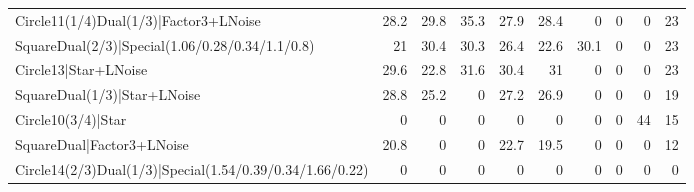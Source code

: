 \begin{tabular}{lrrrrrrrrr}
 Circle11(1/4)Dual(1/3)|Factor3+LNoise                    &           28.2 &           29.8 &            35.3 &           27.9 &           28.4 &             0   &             0   &             0   &           23 \\
 SquareDual(2/3)|Special(1.06/0.28/0.34/1.1/0.8)          &           21   &           30.4 &            30.3 &           26.4 &           22.6 &            30.1 &             0   &             0   &           23 \\
 Circle13|Star+LNoise                                     &           29.6 &           22.8 &            31.6 &           30.4 &           31   &             0   &             0   &             0   &           23 \\
 SquareDual(1/3)|Star+LNoise                              &           28.8 &           25.2 &             0   &           27.2 &           26.9 &             0   &             0   &             0   &           19 \\
 Circle10(3/4)|Star                                       &            0   &            0   &             0   &            0   &            0   &             0   &             0   &            44   &           15 \\
 SquareDual|Factor3+LNoise                                &           20.8 &            0   &             0   &           22.7 &           19.5 &             0   &             0   &             0   &           12 \\
 Circle14(2/3)Dual(1/3)|Special(1.54/0.39/0.34/1.66/0.22) &            0   &            0   &             0   &            0   &            0   &             0   &             0   &             0   &            0 \\
\hline
\end{tabular}